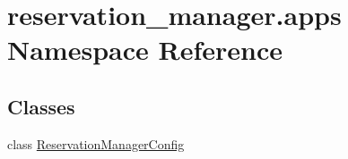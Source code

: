 \hypertarget{namespacereservation__manager_1_1apps}{\section{reservation\-\_\-manager.\-apps Namespace Reference}
\label{namespacereservation__manager_1_1apps}
}
\subsection*{Classes}
\begin{DoxyCompactItemize}
\item 
class \hyperlink{classreservation__manager_1_1apps_1_1ReservationManagerConfig}{Reservation\-Manager\-Config}
\end{DoxyCompactItemize}
